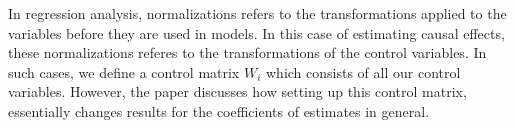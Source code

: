 In regression analysis, normalizations refers to the transformations applied to the variables before they are used in models. In this case of estimating causal effects, these normalizations referes to the transformations of the control variables. In such cases, we define a control matrix $W_i$ which consists of all our control variables. However, the paper discusses how setting up this control matrix, essentially changes results for the coefficients of estimates in general. 